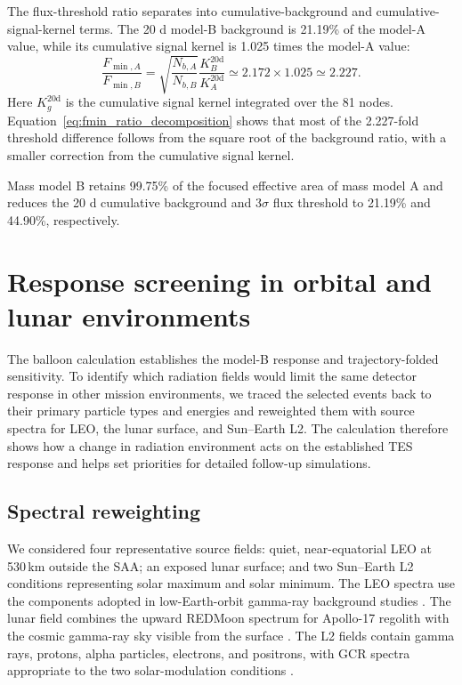 \documentclass[11pt]{article}
\begin{document}
\FloatBarrier

The flux-threshold ratio separates into cumulative-background and cumulative-signal-kernel terms. The 20 d model-B background is 21.19\% of the model-A value, while its cumulative signal kernel is 1.025 times the model-A value:
\begin{equation}
 \frac{F_{\min,A}}{F_{\min,B}}
 =\sqrt{\frac{N_{b,A}}{N_{b,B}}}\frac{K_B^{20\mathrm d}}{K_A^{20\mathrm d}}
 \simeq2.172\times1.025
 \simeq2.227 .
 \label{eq:fmin_ratio_decomposition}
\end{equation}
Here $K_g^{20\mathrm d}$ is the cumulative signal kernel integrated over the 81 nodes. Equation~\eqref{eq:fmin_ratio_decomposition} shows that most of the 2.227-fold threshold difference follows from the square root of the background ratio, with a smaller correction from the cumulative signal kernel.

Mass model B retains 99.75\% of the focused effective area of mass model A and reduces the 20 d cumulative background and $3\sigma$ flux threshold to 21.19\% and 44.90\%, respectively.

\FloatBarrier

\section{Response screening in orbital and lunar environments}
\label{sec:environment_screening}

The balloon calculation establishes the model-B response and trajectory-folded
sensitivity. To identify which radiation fields would limit the same
detector response in other mission environments, we traced the selected events
back to their primary particle types and energies and reweighted them with
source spectra for LEO, the lunar surface, and Sun--Earth L2. The calculation
therefore shows how a change in radiation environment acts on the established
TES response and helps set priorities for detailed follow-up simulations.

\subsection{Spectral reweighting}

We considered four representative source fields: quiet, near-equatorial LEO at
530\,km outside the SAA; an exposed lunar surface; and two Sun--Earth L2
conditions representing solar maximum and solar minimum. The LEO spectra use
the components adopted in low-Earth-orbit gamma-ray background studies
\cite{Cumani2019LEO}. The lunar field combines the upward REDMoon spectrum for
Apollo-17 regolith with the cosmic gamma-ray sky visible from the surface
\cite{Dobynde2021REDMoon}. The L2 fields contain gamma rays, protons, alpha
particles, electrons, and positrons, with GCR spectra appropriate to the two
solar-modulation conditions
\cite{Lotti2021Athena,Usoskin2005,Kuznetsov2017}.
\end{document}
